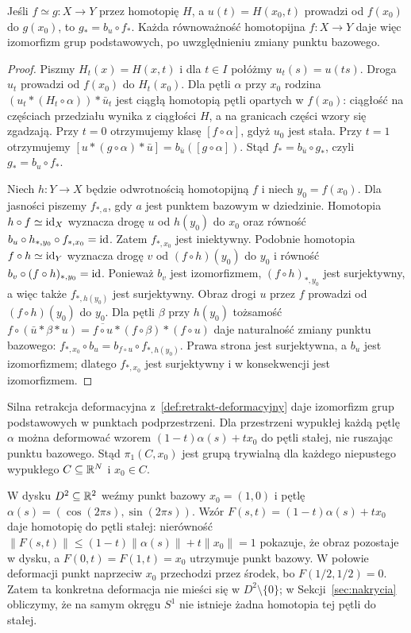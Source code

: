 \begin{wniosek}
\label{cor:pi1-homotopia}
Jeśli $f\simeq g:X\to Y$ przez homotopię
$H$, a $u(t)=H(x_0,t)$ prowadzi od
$f(x_0)$ do $g(x_0)$, to
$g_*=b_u\circ f_*$. Każda równoważność
homotopijna $f:X\to Y$ daje więc
izomorfizm grup podstawowych,
po uwzględnieniu zmiany punktu bazowego.
\end{wniosek}
\begin{proof}
Piszmy $H_t(x)=H(x,t)$ i dla $t\in I$ połóżmy
$u_t(s)=u(ts)$. Droga $u_t$ prowadzi od $f(x_0)$
do $H_t(x_0)$. Dla pętli $\alpha$ przy $x_0$
rodzina $(u_t*(H_t\circ\alpha))*\bar u_t$ jest
ciągłą homotopią pętli opartych w $f(x_0)$:
ciągłość na częściach przedziału wynika z ciągłości
$H$, a na granicach części wzory się zgadzają.
Przy $t=0$ otrzymujemy klasę $[f\circ\alpha]$,
gdyż $u_0$ jest stała. Przy $t=1$ otrzymujemy
$[u*(g\circ\alpha)*\bar u]
=b_{\bar u}([g\circ\alpha])$.
Stąd $f_*=b_{\bar u}\circ g_*$, czyli $g_*=b_u\circ f_*$.

Niech $h:Y\to X$ będzie odwrotnością homotopijną
$f$ i niech $y_0=f(x_0)$. Dla jasności piszemy
$f_{*,a}$, gdy $a$ jest punktem bazowym w dziedzinie.
Homotopia $h\circ f\simeq\mathrm{id}_X$ wyznacza drogę
$u$ od $h(y_0)$ do $x_0$ oraz równość
$b_u\circ h_{*,y_0}\circ f_{*,x_0}=\mathrm{id}$.
Zatem $f_{*,x_0}$ jest iniektywny.
Podobnie homotopia $f\circ h\simeq\mathrm{id}_Y$ wyznacza
drogę $v$ od $(f\circ h)(y_0)$ do $y_0$ i równość
$b_v\circ(f\circ h)_{*,y_0}=\mathrm{id}$. Ponieważ $b_v$ jest
izomorfizmem, $(f\circ h)_{*,y_0}$ jest surjektywny,
a więc także $f_{*,h(y_0)}$ jest surjektywny.
Obraz drogi $u$ przez $f$ prowadzi od $(f\circ h)(y_0)$
do $y_0$. Dla pętli $\beta$ przy $h(y_0)$
tożsamość $f\circ(\bar u*\beta*u)
=\overline{f\circ u}*(f\circ\beta)*(f\circ u)$
daje naturalność zmiany punktu bazowego:
$f_{*,x_0}\circ b_u=b_{f\circ u}\circ f_{*,h(y_0)}$.
Prawa strona jest surjektywna, a $b_u$ jest
izomorfizmem; dlatego $f_{*,x_0}$ jest
surjektywny i w konsekwencji jest izomorfizmem.
\end{proof}

Silna retrakcja deformacyjna
z~\ref{def:retrakt-deformacyjny} daje
izomorfizm grup podstawowych w punktach
podprzestrzeni. Dla przestrzeni wypukłej
każdą pętlę $\alpha$ można deformować
wzorem $(1-t)\alpha(s)+tx_0$ do pętli
stałej, nie ruszając punktu bazowego.
Stąd $\pi_1(C,x_0)$ jest grupą trywialną
dla każdego niepustego wypukłego $C\subseteq\mathbb{R}^N$
i $x_0\in C$.

\begin{przyklad}
\label{prz:petla-w-dysku}
W dysku $D^2\subseteq\mathbb{R}^2$ weźmy punkt bazowy
$x_0=(1,0)$ i pętlę
$\alpha(s)=(\cos(2\pi s),\sin(2\pi s))$.
Wzór $F(s,t)=(1-t)\alpha(s)+t x_0$ daje
homotopię do pętli stałej: nierówność
$\|F(s,t)\|\leq(1-t)\|\alpha(s)\|+t\|x_0\|=1$
pokazuje, że obraz pozostaje w dysku, a
$F(0,t)=F(1,t)=x_0$ utrzymuje punkt bazowy.
W połowie deformacji punkt naprzeciw $x_0$
przechodzi przez środek, bo $F(1/2,1/2)=0$.
Zatem ta konkretna deformacja nie mieści się
w $D^2\setminus\{0\}$; w Sekcji~\ref{sec:nakrycia}
obliczymy, że na samym okręgu $S^1$ nie istnieje
żadna homotopia tej pętli do stałej.
\end{przyklad}

